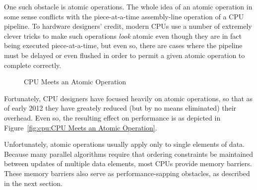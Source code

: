 One such obstacle is atomic operations.
The whole idea of an atomic operation in some sense conflicts with
the piece-at-a-time assembly-line operation of a CPU pipeline.
To hardware designers' credit, modern CPUs use a number of extremely clever
tricks to make such operations \emph{look} atomic even though they
are in fact being executed piece-at-a-time, but even so, there are
cases where the pipeline must be delayed or even flushed in order to
permit a given atomic operation to complete correctly.

\begin{figure}[htb]
\begin{center}
\end{center}
\caption{CPU Meets an Atomic Operation}
\end{figure}

Fortunately, CPU designers have focused heavily on atomic operations,
so that as of early 2012 they have greately reduced (but by no
means eliminated) their overhead.
Even so, the resulting effect on performance is as depicted in
Figure~\ref{fig:cpu:CPU Meets an Atomic Operation}.

Unfortunately, atomic operations usually apply only to single elements
of data.
Because many parallel algorithms require that ordering constraints
be maintained between updates of multiple data elements, most CPUs
provide memory barriers.
These memory barriers also serve as performance-sapping obstacles,
as described in the next section.

